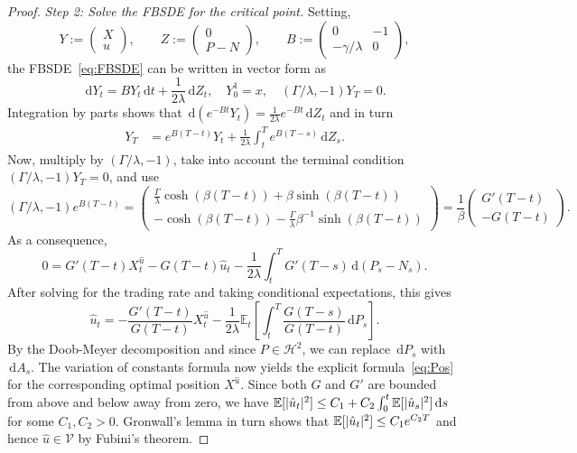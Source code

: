 \documentclass[11pt]{article}
\numberwithin{equation}{section}
\theoremstyle{definition}
\theoremstyle{remark}
\newcommand{\E}{\mathbb{E}} %
\DeclarePairedDelimiter{\abs}{\lvert}{\rvert} %
\newcommand{\de}{\,\mathrm{d}}
\begin{document}
\begin{proof}
\emph{Step 2: Solve the FBSDE for the critical point.} 
Setting,
\[
 Y:=\begin{pmatrix} X \\ u\end{pmatrix},\qquad Z:=\begin{pmatrix} 0 \\ P-N\end{pmatrix},\qquad B:=\begin{pmatrix} 0 & -1 \\ -\gamma/\lambda & 0\end{pmatrix},
\]
the FBSDE~\eqref{eq:FBSDE} can be written in vector form as 
\[
\de Y_t = B Y_t \de t + \frac{1}{2\lambda}\de Z_t, \quad Y^1_0=x, \quad (\Gamma/\lambda, -1)Y_T = 0.
\]
Integration by parts shows that $\de (e^{-B t}Y_t)=\frac{1}{2\lambda}e^{-B t}\de Z_t$ and in turn
\begin{align*}
Y_T &= e^{B(T-t)}Y_t+\frac{1}{2\lambda}\int_t^T e^{B(T-s)}\de Z_s.%
\end{align*}
Now, multiply by $(\Gamma/\lambda,-1)$, take into account the terminal condition $(\Gamma/\lambda, -1)Y_T = 0$, and use  
$$
(\Gamma/\lambda, -1)e^{B(T-t)}=\begin{pmatrix} \frac{\Gamma}{\lambda}\cosh(\beta (T-t))+\beta \sinh(\beta(T-t)) \\ -\cosh(\beta(T-t))-\frac{\Gamma}{\lambda}\beta^{-1} \sinh(\beta(T-t))\end{pmatrix}=\frac{1}{\beta}\begin{pmatrix} G'(T-t) \\ -G(T-t) \end{pmatrix}.
$$
As a consequence,
$$
0=G'(T-t)X^{\hat{u}}_t-G(T-t)\hat{u}_t-\frac{1}{2\lambda}\int_t^T G'(T-s) \de (P_s-N_s).
$$
After solving for the trading rate and taking conditional expectations, this gives
$$
\hat{u}_t = -\frac{G'(T-t)}{G(T-t)} X^{\hat{u}}_t - \frac{1}{2\lambda} \E_t\left[\int_t^T\frac{G(T-s)}{G(T-t)} \de P_s\right].
$$
By the Doob-Meyer decomposition and since $P \in \mathcal{H}^2$, we can replace $\de P_s$ with $\de A_s$. The variation of constants formula now yields the explicit formula~\eqref{eq:Pos} for the corresponding optimal position $X^{\hat{u}}$. Since both $G$ and $G'$ are bounded from above and below away from zero, we have $\E[\abs{\hat{u}_t}^2] \le C_1 +C_2\int_0^t \E[\abs{\hat{u}_s}^2] \de s$ for some $C_1, C_2 > 0$. Gronwall's lemma in turn shows that $\E[\abs{\hat{u}_t}^2]\le C_1 e^{C_2 T}$ and hence $\hat{u}\in\mathcal V$ by Fubini's theorem.


\end{proof}
\end{document}
